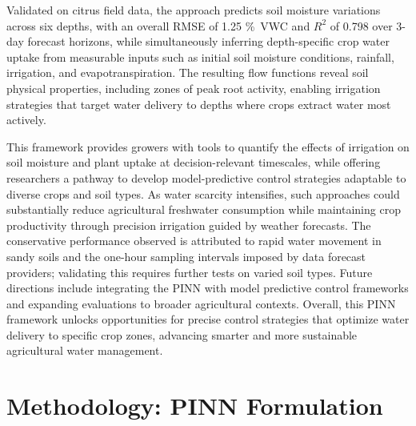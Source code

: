 \documentclass[pdflatex,sn-nature]{sn-jnl}%
\theoremstyle{thmstyleone}%
\theoremstyle{thmstyletwo}%
\theoremstyle{thmstylethree}%
\begin{document}
Validated on citrus field data, the approach predicts soil moisture variations across six depths, with an overall RMSE of 1.25 \si{\% VWC} and $R^2$ of 0.798 over 3-day forecast horizons, while simultaneously inferring depth-specific crop water uptake from measurable inputs such as initial soil moisture conditions, rainfall, irrigation, and evapotranspiration. The resulting flow functions reveal soil physical properties, including zones of peak root activity, enabling irrigation strategies that target water delivery to depths where crops extract water most actively.

This framework provides growers with tools to quantify the effects of irrigation on soil moisture and plant uptake at decision-relevant timescales, while offering researchers a pathway to develop model-predictive control strategies adaptable to diverse crops and soil types. As water scarcity intensifies, such approaches could substantially reduce agricultural freshwater consumption while maintaining crop productivity through precision irrigation guided by weather forecasts. 
The conservative performance observed is attributed to rapid water movement in sandy soils and the one-hour sampling intervals imposed by data forecast providers; validating this requires further tests on varied soil types. Future directions include integrating the PINN with model predictive control frameworks and expanding evaluations to broader agricultural contexts. Overall, this PINN framework unlocks opportunities for precise control strategies that optimize water delivery to specific crop zones, advancing smarter and more sustainable agricultural water management.


\section{Methodology: PINN Formulation} \label{Methodology}
\end{document}
